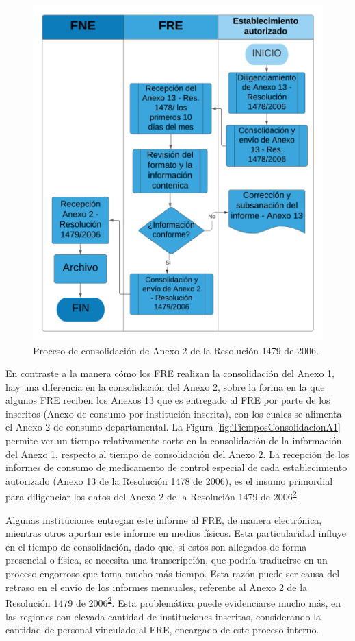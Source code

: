 \documentclass[
]{book}
\begin{document}
\begin{figure}

{\centering \includegraphics[width=0.8\linewidth]{figures/Consolidacion_A2_Res_1479_2006} 

}

\caption{Proceso de consolidación de Anexo 2 de la Resolución 1479 de 2006.}\label{fig:procesoA2-1479}
\end{figure}

En contraste a la manera cómo los FRE realizan la consolidación del Anexo 1, hay una diferencia en la consolidación del Anexo 2, sobre la forma en la que algunos FRE reciben los Anexos 13 que es entregado al FRE por parte de los inscritos (Anexo de consumo por institución inscrita), con los cuales se alimenta el Anexo 2 de consumo departamental. La Figura \ref{fig:TiemposConsolidacionA1} permite ver un tiempo relativamente corto en la consolidación de la información del Anexo 1, respecto al tiempo de consolidación del Anexo 2. La recepción de los informes de consumo de medicamento de control especial de cada establecimiento autorizado (Anexo 13 de la Resolución 1478 de 2006), es el insumo primordial para diligenciar los datos del Anexo 2 de la Resolución 1479 de 2006\textsuperscript{\protect\hyperlink{ref-MSPS1479-2006}{2}}.

Algunas instituciones entregan este informe al FRE, de manera electrónica, mientras otros aportan este informe en medios físicos. Esta particularidad influye en el tiempo de consolidación, dado que, si estos son allegados de forma presencial o física, se necesita una transcripción, que podría traducirse en un proceso engorroso que toma mucho más tiempo. Esta razón puede ser causa del retraso en el envío de los informes mensuales, referente al Anexo 2 de la Resolución 1479 de 2006\textsuperscript{\protect\hyperlink{ref-MSPS1479-2006}{2}}. Esta problemática puede evidenciarse mucho más, en las regiones con elevada cantidad de instituciones inscritas, considerando la cantidad de personal vinculado al FRE, encargado de este proceso interno.
\end{document}
